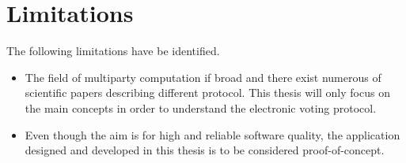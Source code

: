 \section{Limitations}

The following limitations have be identified.

\begin{itemize}
    \item The field of multiparty computation if broad and there exist numerous of scientific papers describing different protocol. This thesis will only focus on the main concepts in order to understand
    the electronic voting protocol. 
    
    \item Even though the aim is for high and reliable software quality, the application designed and developed in this thesis is to be considered proof-of-concept. 
\end{itemize}